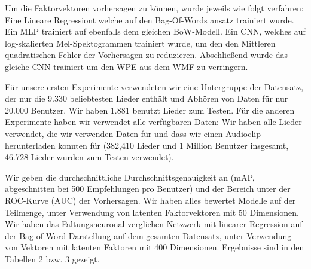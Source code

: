 \documentclass[twosided,a4,10pt]{article}
\begin{document}
\begin{multicols}{2}
		
		
		Um die Faktorvektoren vorhersagen zu können, wurde jeweils wie folgt verfahren:
		Eine Lineare Regressiont welche auf den Bag-Of-Words ansatz trainiert wurde. Ein MLP trainiert auf ebenfalls dem gleichen BoW-Modell. Ein CNN, welches auf log-skalierten Mel-Spektogrammen trainiert wurde, um den den Mittleren quadratischen Fehler der Vorhersagen zu reduzieren. Abschließend wurde das gleiche CNN trainiert um den WPE aus dem WMF zu verringern.
		
		
		Für unsere ersten Experimente verwendeten wir eine Untergruppe der Datensatz, der nur die 9.330 beliebtesten Lieder enthält und Abhören von Daten für nur 20.000 Benutzer. Wir haben 1.881 benutzt Lieder zum Testen. Für die anderen Experimente haben wir verwendet alle verfügbaren Daten: Wir haben alle Lieder verwendet, die wir verwenden Daten für und dass wir einen Audioclip herunterladen konnten für (382,410 Lieder und 1 Million Benutzer insgesamt, 46.728 Lieder wurden zum Testen verwendet).
		
		Wir geben die durchschnittliche Durchschnittsgenauigkeit an (mAP, abgeschnitten bei 500 Empfehlungen pro Benutzer) und der Bereich unter der ROC-Kurve (AUC) der Vorhersagen. Wir haben alles bewertet Modelle auf der Teilmenge, unter Verwendung von latenten Faktorvektoren mit 50 Dimensionen. Wir haben das Faltungsneuronal verglichen Netzwerk mit linearer Regression auf der Bag-of-Word-Darstellung auf dem gesamten Datensatz, unter Verwendung von Vektoren mit latenten Faktoren mit 400 Dimensionen. Ergebnisse sind in den Tabellen 2 bzw. 3 gezeigt.
		

\end{multicols}
\end{document}
